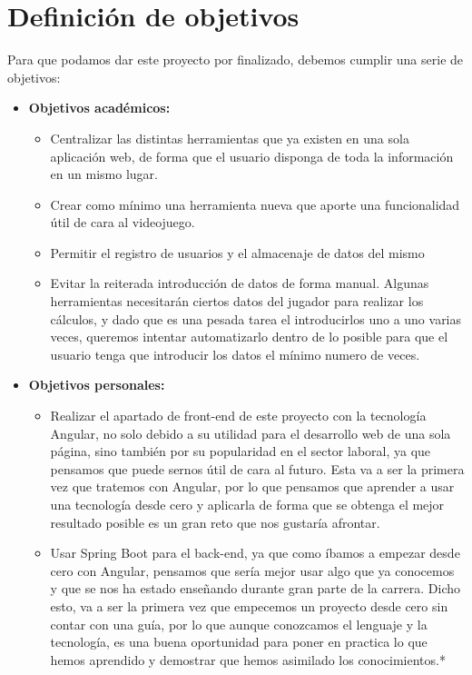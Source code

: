\chapter{Definici\'on de objetivos}\label{defobjetivos}

Para que podamos dar este proyecto por finalizado, debemos cumplir una serie de objetivos:

\begin{itemize}
	\item \textbf{Objetivos académicos:}
	\begin{itemize}
		\item Centralizar las distintas herramientas que ya existen en una sola aplicación web, de forma que el usuario disponga de toda la información en un mismo lugar.
		
		\item Crear como mínimo una herramienta nueva que aporte una funcionalidad útil de cara al videojuego.
		
		\item Permitir el registro de usuarios y el almacenaje de datos del mismo
		
		\item Evitar la reiterada introducción de datos de forma manual. Algunas herramientas necesitarán ciertos datos del jugador para realizar los cálculos, y dado que es una pesada tarea el introducirlos uno a uno varias veces, queremos intentar automatizarlo dentro de lo posible para que el usuario tenga que introducir los datos el mínimo numero de veces.
	\end{itemize}
	\item \textbf{Objetivos personales:}
	\begin{itemize}
		\item Realizar el apartado de front-end de este proyecto con la tecnología Angular, no solo debido a su utilidad para el desarrollo web de una sola página, sino también por su popularidad en el sector laboral, ya que pensamos que puede sernos útil de cara al futuro. Esta va a ser la primera vez que tratemos con Angular, por lo que pensamos que aprender a usar una tecnología desde cero y aplicarla de forma que se obtenga el mejor resultado posible es un gran reto que nos gustaría afrontar.
		
		\item Usar Spring Boot para el back-end, ya que como íbamos a empezar desde cero con Angular, pensamos que sería mejor usar algo que ya conocemos y que se nos ha estado enseñando durante gran parte de la carrera. Dicho esto, va a ser la primera vez que empecemos un proyecto desde cero sin contar con una guía, por lo que aunque conozcamos el lenguaje y la tecnología, es una buena oportunidad para poner en practica lo que hemos aprendido y demostrar que hemos asimilado los conocimientos.*\\
		

\end{itemize}
\end{itemize}
